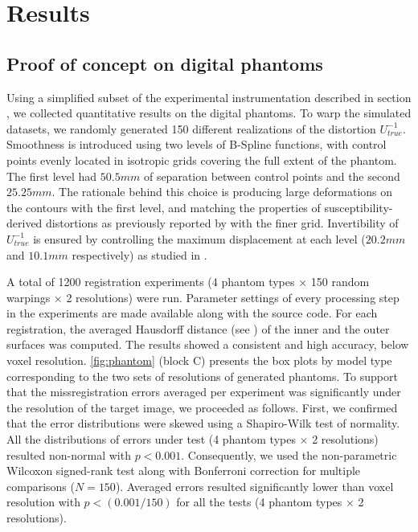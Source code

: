 \section*{Results}
\label{sec:results}

\subsection*{Proof of concept on digital phantoms}
\label{sec:results_phantom}
Using a simplified subset of the experimental instrumentation described in section
  , we collected quantitative results on the digital
  phantoms.
To warp the simulated datasets, we randomly generated 150 different realizations of
  the distortion $U^{-1}_{true}$.
Smoothness is introduced using two levels of B-Spline functions, with control points evenly
  located in isotropic grids covering the full extent of the phantom.
The first level had $50.5mm$ of separation between control points and the second $25.25mm$.
The rationale behind this choice is producing large deformations on the contours with
  the first level, and matching the properties of susceptibility-derived distortions
  as previously reported by \cite{irfanoglu_susceptibility_2011} with the finer grid.
Invertibility of $U^{-1}_{true}$ is ensured by controlling the maximum displacement at each
  level ($20.2mm$ and $10.1mm$ respectively) as studied in \citep{rueckert_diffeomorphic_2006}.

A total of 1200 registration experiments (4 phantom types $\times$ 150 random warpings
  $\times$ 2 resolutions) were run.
Parameter settings of every processing step in the experiments are made available along with
  the source code.
For each registration, the averaged Hausdorff distance (see )
  of the inner and the outer surfaces was computed.
The results showed a consistent and high accuracy, below voxel resolution.
\autoref{fig:phantom} (block C) presents the box plots by model type corresponding
  to the two sets of resolutions of generated phantoms.
To support that the missregistration errors averaged per experiment was significantly
  under the resolution of the target image, we proceeded as follows.
First, we confirmed that the error distributions were skewed using a Shapiro-Wilk test of
  normality.
All the distributions of errors under test (4 phantom types $\times$ 2 resolutions) resulted
  non-normal with $p<0.001$.
Consequently, we used the non-parametric Wilcoxon signed-rank test along with Bonferroni
  correction for multiple comparisons ($N=150$).
Averaged errors resulted significantly lower than voxel resolution with $p < (0.001 / 150)$
  for all the tests (4 phantom types $\times$ 2 resolutions).


